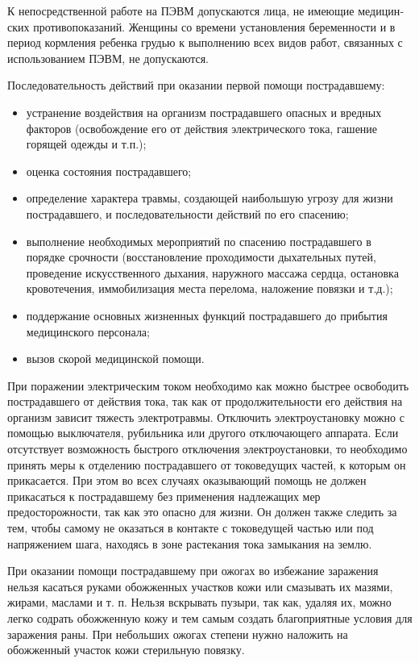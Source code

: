К непосредственной работе на ПЭВМ допускаются лица, не имеющие медицин­ских противопоказаний. 
Женщины со времени установления беременности и в период кормления ре­бенка грудью к выполнению 
всех видов работ, связанных с использованием ПЭВМ, не допускаются.

Последовательность действий при оказании первой помощи пострадавшему:
\begin{itemize}
 \item устранение воздействия на организм пострадавшего опасных и вредных факторов 
(освобождение его от действия электрического тока, гашение горящей одежды и т.п.);
 \item оценка состояния пострадавшего;
 \item определение характера травмы, создающей наибольшую угрозу для жизни пострадавшего, 
и последовательности действий по его спасению;
 \item выполнение необходимых мероприятий по спасению пострадавшего в порядке срочности 
(восстановление проходимости дыхательных путей, проведение искусственного дыхания, 
наружного массажа сердца, остановка кровотечения, иммобилизация места перелома, наложение повязки и т.д.);
 \item поддержание основных жизненных функций пострадавшего до прибытия медицинского персонала;
 \item вызов скорой медицинской помощи.
\end{itemize}

При поражении электрическим током необходимо как можно быстрее освободить пострадавшего от 
действия тока, так как от продолжительности его действия на организм зависит тяжесть электротравмы. 
Отключить электроустановку можно с помощью выключателя, рубильника или другого отключающего аппарата.
Если отсутствует возможность быстрого отключения электроустановки, то необходимо принять меры к 
отделению пострадавшего от токоведущих частей, к которым он прикасается. 
При этом во всех случаях оказывающий помощь не должен прикасаться к пострадавшему без применения 
надлежащих мер предосторожности, так как это опасно для жизни. Он должен также следить за тем, 
чтобы самому не оказаться в контакте с токоведущей частью или под напряжением шага, 
находясь в зоне растекания тока замыкания на землю.

При оказании помощи пострадавшему при ожогах во избежание заражения нельзя касаться руками 
обожженных участков кожи или смазывать их мазями, жирами, маслами и т. п.
Нельзя вскрывать пузыри, так как, удаляя их, можно легко содрать обожженную кожу и тем самым 
создать благоприятные условия для заражения раны.
При небольших ожогах степени нужно наложить на обожженный участок кожи стерильную повязку.

